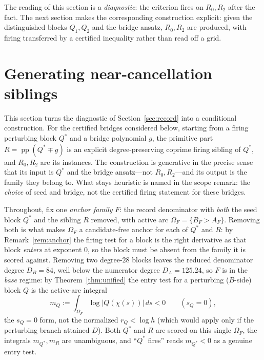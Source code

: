\documentclass[11pt,reqno]{amsart}
\theoremstyle{plain}
\theoremstyle{definition}
\theoremstyle{remark}
\newcommand{\rQ}{r_Q}
\newcommand{\dA}{D_A}
\newcommand{\dB}{D_B}
\DeclareMathOperator{\pp}{pp}
\begin{document}
The reading of this section is a \emph{diagnostic}: the criterion fires on $R_0,R_2$
after the fact. The next section makes the corresponding construction explicit: given
the distinguished blocks $Q_1,Q_2$ and the bridge ansatz, $R_0,R_2$ are produced, with
firing transferred by a certified inequality rather than read off a grid.

\section{Generating near-cancellation siblings}\label{sec:generator}

This section turns the diagnostic of Section~\ref{sec:record} into a conditional
construction.  For the certified bridges considered below, starting from a firing
perturbing block $Q^*$ and a bridge polynomial $g$, the primitive part
$R=\pp(Q^*\mp g)$ is an explicit degree-preserving coprime firing sibling of $Q^*$, and
$R_0,R_2$ are its instances. The construction is generative in the precise sense that
its input is $Q^*$ and the bridge ansatz---not $R_0,R_2$---and its output is the family
they belong to. What stays heuristic is named in the scope remark: the \emph{choice} of
seed and bridge, not the certified firing statement for these bridges.

Throughout, fix one \emph{anchor family} $F$: the record denominator with \emph{both}
the seed block $Q^*$ and the sibling $R$ removed, with active arc
$\Omega_F=\{B_F>A_F\}$. Removing both is what makes $\Omega_F$ a candidate-free anchor
for each of $Q^*$ and $R$: by Remark~\ref{rem:anchor} the firing test for a block is the
right derivative as that block \emph{enters} at exponent $0$, so the block must be absent
from the family it is scored against. Removing two degree-$28$ blocks leaves the reduced
denominator degree $\dB=84$, well below the numerator degree $\dA=125.24$, so $F$ is in
the \emph{base} regime: by Theorem~\ref{thm:unified} the entry test for a perturbing
($B$-side) block $Q$ is the active-arc integral
\begin{equation}\label{eq:mdef}
  m_Q:=\int_{\Omega_F}\log|Q(\chi(s))|\,ds<0\qquad(s_Q=0),
\end{equation}
the $s_Q=0$ form, not the normalized $\rQ<\log h$ (which would apply only if the
perturbing branch attained $D$). Both $Q^*$ and $R$ are scored on this single
$\Omega_F$, the integrals $m_{Q^*},m_R$ are unambiguous, and ``$Q^*$ fires'' reads
$m_{Q^*}<0$ as a genuine entry test.
\end{document}
